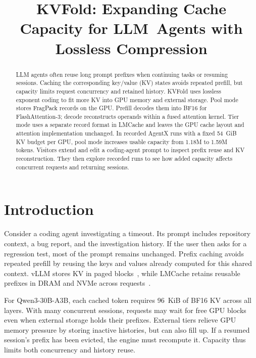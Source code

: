 \documentclass[conference]{IEEEtran}
\title{KVFold: Expanding Cache Capacity for \mbox{LLM Agents} with Lossless Compression}
\author{\IEEEauthorblockN{Working draft}
\IEEEauthorblockA{Author information to be supplied}}
\begin{document}
\maketitle

\begin{abstract}
LLM agents often reuse long prompt prefixes when continuing tasks or
resuming sessions. Caching the corresponding key/value (KV) states avoids
repeated prefill, but capacity limits request concurrency and retained
history. KVFold uses lossless
exponent coding to fit more KV into GPU memory and external storage.
Pool mode stores FragPack records on the GPU. Prefill decodes them into
BF16 for FlashAttention-3; decode reconstructs operands within a fused
attention kernel. Tier mode uses a separate record
format in LMCache and leaves the GPU cache layout and attention
implementation unchanged. In recorded AgentX runs with a fixed 54~GiB KV
budget per GPU, pool mode increases usable capacity from 1.18M to 1.59M
tokens. Visitors extend and edit a coding-agent prompt to inspect prefix
reuse and KV reconstruction. They then explore recorded runs to see how
added capacity affects concurrent requests and returning sessions.
\end{abstract}

\section{Introduction}
Consider a coding agent investigating a timeout. Its prompt includes
repository context, a bug report, and the investigation history. If the
user then asks for a regression test, most of the prompt remains unchanged.
Prefix caching avoids repeated prefill by reusing the keys and values
already computed for this shared context. vLLM stores KV in paged
blocks~\cite{vllm}, while LMCache retains
reusable prefixes in DRAM and NVMe across requests~\cite{lmcache}.

For Qwen3-30B-A3B, each cached token requires 96~KiB of BF16 KV across all
layers. With many concurrent sessions, requests may wait for free GPU
blocks even when external storage holds their prefixes. External tiers
relieve GPU memory pressure by storing inactive histories, but can also
fill up. If a resumed session's prefix has been evicted, the engine must
recompute it. Capacity thus limits both concurrency and history reuse.
\end{document}

